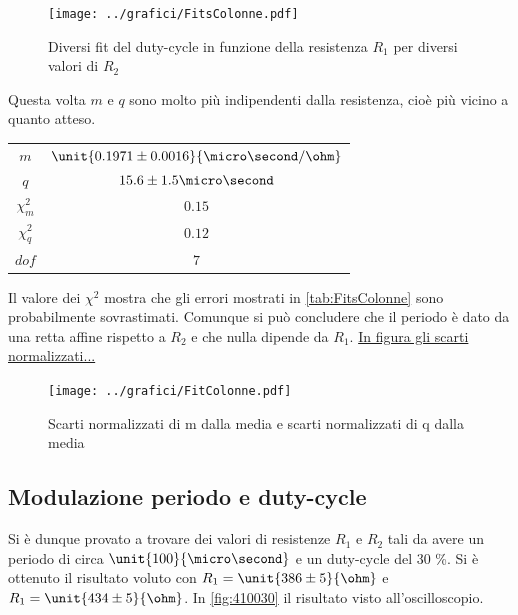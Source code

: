 \documentclass[a4paper,10pt]{article}
\begin{document}
\begin{figure}[H]
	\centering
	\texttt{[image: ../grafici/FitsColonne.pdf]}
	\caption{Diversi fit del duty-cycle in funzione della resistenza $R_1$ per diversi valori di $R_2$}
	\label{fig:FitsColonne}
\end{figure}


Questa volta $m$ e $q$ sono molto più indipendenti dalla resistenza, cioè più vicino a quanto atteso.

\begin{table}[H]
\centering
\begin{tabular}{c|c} 
$m$ & $\unit{0.1971 \pm 0.0016}{\micro\second/\ohm} $\\
$q$ & ${15.6 \pm 1.5}{\micro\second}$\\
$\chi^2_m$ & $0.15$\\
$\chi^2_q$ & $0.12$\\
$dof$ & $7$\\
\end{tabular}
\end{table}



Il valore dei $\chi^2$ mostra che gli errori mostrati in \cref{tab:FitsColonne} sono probabilmente sovrastimati. Comunque si può concludere che il periodo è dato da una retta affine rispetto a $R_2$ e che nulla dipende da $R_1$. \underline{In figura gli scarti normalizzati...}

 
\begin{figure}[H]
	\centering
	\texttt{[image: ../grafici/FitColonne.pdf]}
	\caption{Scarti normalizzati di m dalla media e scarti normalizzati di q dalla media}
	\label{fig:FitColonne}
\end{figure}

\subsection{Modulazione periodo e duty-cycle}

Si è dunque provato a trovare dei valori di resistenze $R_1$ e $R_2$ tali da avere un periodo di circa $\unit{100}{\micro\second}$ e un duty-cycle del 30 \%. Si è ottenuto il risultato voluto con $R_1=\unit{386 \pm 5}{\ohm}$ e  $R_1=\unit{434 \pm 5}{\ohm}$. In \cref{fig:410030} il risultato visto all'oscilloscopio. 
\end{document}
